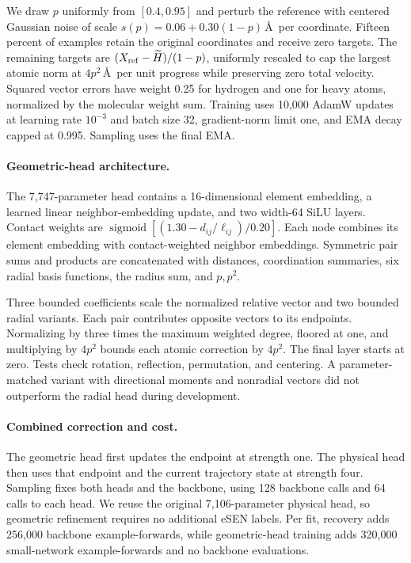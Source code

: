 We draw $p$ uniformly from $[0.4,0.95]$ and perturb the reference with centered Gaussian noise of scale $s(p)=0.06+0.30(1-p)$\,\AA\ per coordinate. Fifteen percent of examples retain the original coordinates and receive zero targets. The remaining targets are $(X_{\rm ref}-\widetilde H)/(1-p)$, uniformly rescaled to cap the largest atomic norm at $4p^2$\,\AA\ per unit progress while preserving zero total velocity. Squared vector errors have weight 0.25 for hydrogen and one for heavy atoms, normalized by the molecular weight sum. Training uses 10,000 AdamW updates at learning rate $10^{-3}$ and batch size 32, gradient-norm limit one, and EMA decay capped at 0.995. Sampling uses the final EMA.

\paragraph{Geometric-head architecture.}
The 7,747-parameter head contains a 16-dimensional element embedding, a learned linear neighbor-embedding update, and two width-64 SiLU layers. Contact weights are $\operatorname{sigmoid}[(1.30-d_{ij}/\ell_{ij})/0.20]$. Each node combines its element embedding with contact-weighted neighbor embeddings. Symmetric pair sums and products are concatenated with distances, coordination summaries, six radial basis functions, the radius sum, and $p,p^2$.

Three bounded coefficients scale the normalized relative vector and two bounded radial variants. Each pair contributes opposite vectors to its endpoints. Normalizing by three times the maximum weighted degree, floored at one, and multiplying by $4p^2$ bounds each atomic correction by $4p^2$. The final layer starts at zero. Tests check rotation, reflection, permutation, and centering. A parameter-matched variant with directional moments and nonradial vectors did not outperform the radial head during development.

\paragraph{Combined correction and cost.}
The geometric head first updates the endpoint at strength one. The physical head then uses that endpoint and the current trajectory state at strength four. Sampling fixes both heads and the backbone, using 128 backbone calls and 64 calls to each head. We reuse the original 7,106-parameter physical head, so geometric refinement requires no additional eSEN labels. Per fit, recovery adds 256,000 backbone example-forwards, while geometric-head training adds 320,000 small-network example-forwards and no backbone evaluations.

